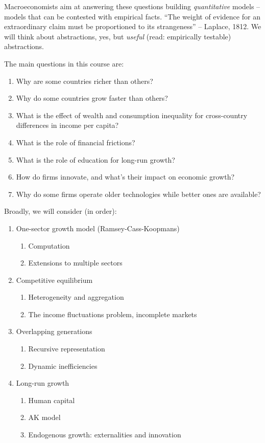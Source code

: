 \documentclass[10pt]{article}
\begin{document}
Macroeconomists aim at answering these questions building \emph{quantitative} models -- models that can be contested with empirical facts. ``The weight of evidence for an extraordinary claim must be proportioned to its strangeness'' -- Laplace, 1812. We will think about abstractions, yes, but \emph{useful} (read: empirically testable) abstractions.

The main questions in this course are:
\begin{enumerate}
	\item Why are some countries richer than others?
	\item Why do some countries grow faster than others?
	\item What is the effect of wealth and consumption inequality for cross-country differences in income per capita?
	\item What is the role of financial frictions?
	\item What is the role of education for long-run growth?
	\item How do firms innovate, and what’s their impact on economic growth?
	\item Why do some firms operate older technologies while better ones are available?
\end{enumerate}

Broadly, we will consider (in order):
\begin{enumerate}
	\item One-sector growth model (Ramsey-Cass-Koopmans)
	\begin{enumerate}
		\item Computation
		\item Extensions to multiple sectors
	\end{enumerate}
	\item Competitive equilibrium
	\begin{enumerate}
		\item Heterogeneity and aggregation
		\item The income fluctuations problem, incomplete markets
	\end{enumerate}
	\item Overlapping generations
	\begin{enumerate}
		\item Recursive representation
		\item Dynamic inefficiencies
	\end{enumerate}
	\item Long-run growth
	\begin{enumerate}
		\item Human capital
		\item AK model
		\item Endogenous growth: externalities and innovation
	\end{enumerate}
\end{enumerate}
\end{document}
